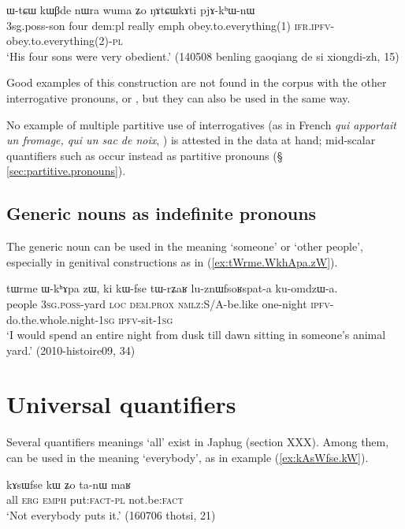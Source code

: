  \begin{exe}
\ex \label{ex:NAtCWkAti}
\gll  ɯ-tɕɯ kɯβde nɯra wuma ʑo ŋɤtɕɯkɤti pjɤ-kʰɯ-nɯ  \\
3sg.poss-son four dem:pl really emph obey.to.everything(1) \textsc{ifr.ipfv}-obey.to.everything(2)-\textsc{pl} \\
\glt `His four sons were very obedient.' (140508 benling gaoqiang de si xiongdi-zh, 15)
\end{exe} 

Good examples of this construction are not found in the corpus with the other interrogative pronouns,  or , but they can also be used in the same way.

No example of multiple partitive use of interrogatives (as in French \textit{qui apportait un fromage, qui un sac de noix}, \citealt[177]{haspelmath97indef} ) is attested in the data at hand; mid-scalar quantifiers such as  occur instead as partitive pronouns (§ \ref{sec:partitive.pronouns}). 

\subsection{Generic nouns as indefinite pronouns}
The generic noun  can be used in the meaning `someone' or `other people', especially in genitival constructions as in (\ref{ex:tWrme.WkhApa.zW}).
 
\begin{exe}
\ex \label{ex:tWrme.WkhApa.zW}
\gll tɯrme ɯ-kʰɤpa zɯ, ki kɯ-fse tɯ-rʑaʁ lu-znɯfsoʁspat-a ku-omdzɯ-a. \\
people \textsc{3sg}.\textsc{poss}-yard \textsc{loc} \textsc{dem}.\textsc{prox} \textsc{nmlz}:S/A-be.like one-night \textsc{ipfv}-do.the.whole.night-\textsc{1sg} \textsc{ipfv}-sit-\textsc{1sg} \\
\glt `I would spend an entire night from dusk till dawn sitting in someone's animal yard.' (2010-histoire09, 34)
\end{exe} 

\section{Universal quantifiers} \label{sec:quantifiers}
Several quantifiers meanings `all' exist in Japhug (section XXX). Among them,  can be used in the meaning `everybody', as in example (\ref{ex:kAsWfse.kW}).

\begin{exe}
\ex \label{ex:kAsWfse.kW}
\gll kɤsɯfse kɯ ʑo ta-nɯ maʁ \\
all \textsc{erg} \textsc{emph} put:\textsc{fact}-\textsc{pl} not.be:\textsc{fact} \\
\glt `Not everybody puts it.' (160706 thotsi, 21)
\end{exe}


